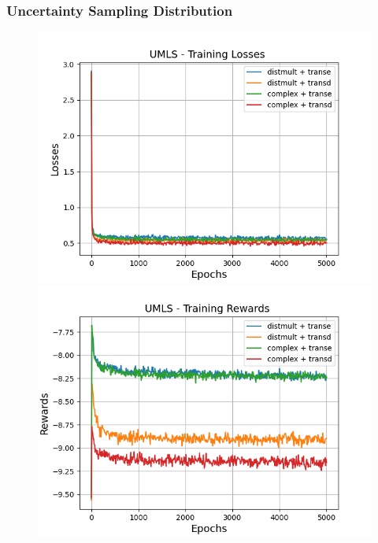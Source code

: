 \subsubsection{Uncertainty Sampling Distribution}

\begin{figure}
    \centering
    \begin{minipage}{.5\textwidth}
      \centering
      \includegraphics[width=0.9\linewidth]{figures/results/gan_train/not_pretrained/uncertainty/max_distribution/entropy/umls/gan_train_uncertainty_umls_losses.png}
    \end{minipage}%
    \begin{minipage}{.5\textwidth}
      \centering
      \includegraphics[width=0.9\linewidth]{figures/results/gan_train/not_pretrained/uncertainty/max_distribution/entropy/umls/gan_train_uncertainty_umls_rewards.png}
    \end{minipage}

\end{figure}

